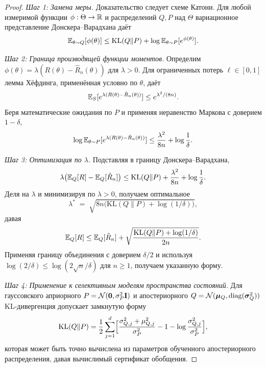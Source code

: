 \begin{proof}
\textit{Шаг 1: Замена меры.} Доказательство следует схеме Катони. Для любой измеримой функции $\phi:\Theta\to\mathbb{R}$ и распределений $Q,P$ над $\Theta$ вариационное представление Донскера--Варадхана даёт
\begin{equation}
\mathbb{E}_{\theta\sim Q}[\phi(\theta)] \le \mathrm{KL}(Q\|P) + \log\mathbb{E}_{\theta\sim P}[e^{\phi(\theta)}].
\end{equation}

\textit{Шаг 2: Граница производящей функции моментов.} Определим $\phi(\theta) = \lambda(R(\theta)-\hat{R}_n(\theta))$ для $\lambda>0$. Для ограниченных потерь $\ell\in[0,1]$ лемма Хёфдинга, применённая условно по $\theta$, даёт
\begin{equation}
\mathbb{E}_S[e^{\lambda(R(\theta)-\hat{R}_n(\theta))}] \le e^{\lambda^2/(8n)}.
\end{equation}
Беря математические ожидания по $P$ и применяя неравенство Маркова с доверием $1-\delta$,
\begin{equation}
\log\mathbb{E}_{\theta\sim P}[e^{\lambda(R(\theta)-\hat{R}_n(\theta))}] \le \frac{\lambda^2}{8n} + \log\frac{1}{\delta}.
\end{equation}

\textit{Шаг 3: Оптимизация по $\lambda$.} Подставляя в границу Донскера--Варадхана,
\begin{equation}
\lambda\bigl(\mathbb{E}_Q[R]-\mathbb{E}_Q[\hat{R}_n]\bigr) \le \mathrm{KL}(Q\|P) + \frac{\lambda^2}{8n} + \log\frac{1}{\delta}.
\end{equation}
Деля на $\lambda$ и минимизируя по $\lambda>0$, получаем оптимальное
\begin{equation*}
\lambda^* \;=\; \sqrt{8n\bigl(\mathrm{KL}(Q\|P)+\log(1/\delta)\bigr)},
\end{equation*}
давая
\begin{equation}
\mathbb{E}_Q[R] \le \mathbb{E}_Q[\hat{R}_n] + \sqrt{\frac{\mathrm{KL}(Q\|P)+\log(1/\delta)}{2n}}.
\end{equation}
Применяя границу объединения с доверием $\delta/2$ и используя $\log(2/\delta)\le\log(2\sqrt{n}/\delta)$ для $n\ge 1$, получаем указанную форму.

\textit{Шаг 4: Применение к селективным моделям пространства состояний.} Для гауссовского априорного $P=\mathcal{N}(\mathbf{0},\sigma_P^2\mathbf{I})$ и апостериорного $Q=\mathcal{N}(\bm{\mu}_Q,\mathrm{diag}(\bm{\sigma}_Q^2))$ KL-дивергенция допускает замкнутую форму
\begin{equation}
\mathrm{KL}(Q\|P) = \frac{1}{2}\sum_{j=1}^d\Bigl[\frac{\sigma_{Q,j}^2+\mu_{Q,j}^2}{\sigma_P^2}-1-\log\frac{\sigma_{Q,j}^2}{\sigma_P^2}\Bigr],
\end{equation}
которая может быть точно вычислена из параметров обученного апостериорного распределения, давая вычислимый сертификат обобщения.
\end{proof}


